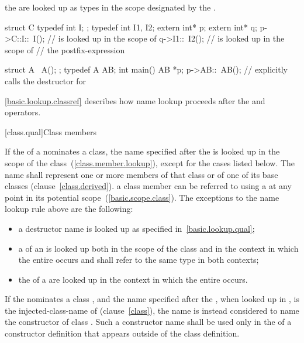 the  are looked up as types in the scope designated
by the . \enterexample

\begin{codeblock}
struct C {
	typedef int I;
};
typedef int I1, I2;
extern int* p;
extern int* q;
p->C::I::~I();			//  is looked up in the scope of 
q->I1::~I2();			//  is looked up in the scope of
				// the postfix-expression

struct A {
	~A();
};
typedef A AB;
int main()
{
	AB *p;
	p->AB::~AB();		// explicitly calls the destructor for 
}
\end{codeblock}
\exitexampleb \enternote \ref{basic.lookup.classref} describes how name
lookup proceeds after the  and \tcode{->} operators. \exitnote

[class.qual]{Class members}

\pnum
{}%
If the  of a 
nominates a class, the name specified after the
 is looked up in the scope of the
class~(\ref{class.member.lookup}), except for the cases listed below.
The name shall represent one or more members of that class or of one of
its base classes (clause~\ref{class.derived}). \enternote a class member
can be referred to using a  at any point in its
potential scope~(\ref{basic.scope.class}). \exitnote The exceptions to
the name lookup rule above are the following:

\begin{itemize}
\item a destructor name is looked up as specified
in~\ref{basic.lookup.qual};

\item a  of an
 is looked up both in the scope of the
class and in the context in which the entire
 occurs and shall refer to the same type
in both contexts;

\item the  of a
 are looked up in the context in which the entire
 occurs.

\end{itemize}

\pnumalt
If the  nominates a class ,
and the name specified after the ,
when looked up in , is the injected-class-name of
 (clause~\ref{class}), the name is instead considered to name the
constructor of class . Such a constructor
name shall be used only in the  of a constructor
definition that appears outside of the class definition. \enterexample

